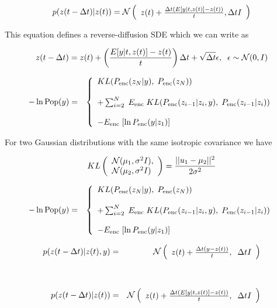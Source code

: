 {

$$p(z(t - \Delta t)|z(t)) = {\cal N}\left(\begin{array}{l} z(t) + \frac{\Delta t(E[y|t,z(t)] - z(t))}{t}, \Delta t I\end{array}\right)$$

\vfill
This equation defines a reverse-diffusion SDE which we can write as

{\huge
$$z(t - \Delta t) = z(t) + \left(\frac{E[y|t,z(t)] - z(t)}{t}\right)\Delta t + \sqrt{\Delta t} \epsilon,\;\;\epsilon \sim {\cal N}(0,I)$$
}

{\huge
\begin{eqnarray*}
  - \ln \mathrm{Pop}(y) & = & \left\{\begin{array}{l} KL(P_{\mathrm{enc}}(z_N|y),\;P_{\mathrm{enc}}(z_N)) \\ \\ + \sum_{i=2}^N  \; E_{\mathrm{enc}}\; KL(P_{\mathrm{enc}}(z_{i-1}|z_i,y),\;P_{\mathrm{enc}}(z_{i-1}|z_i)) \\ \\ - E_{\mathrm{enc}}\;[\ln P_{\mathrm{enc}}(y|z_1)] \end{array}\right.
  \end{eqnarray*}

\vfill
For two Gaussian distributions with the same isotropic covariance we have

\vfill
$$KL\left(\begin{array}{l}{\cal N}(\mu_1,\sigma^2 I), \\ {\cal N}(\mu_2,\sigma^2 I) \end{array}\right) = \frac{||u_1 -\mu_2||^2}{2\sigma^2}$$
}

\begin{eqnarray*}
  - \ln \mathrm{Pop}(y) & = & \left\{\begin{array}{l} KL(P_{\mathrm{enc}}(z_N|y),\;P_{\mathrm{enc}}(z_N)) \\ \\ + \sum_{i=2}^N  \; E_{\mathrm{enc}}\; KL(P_{\mathrm{enc}}(z_{i-1}|z_i,y),\;P_{\mathrm{enc}}(z_{i-1}|z_i)) \\ \\ - E_{\mathrm{enc}}\;[\ln P_{\mathrm{enc}}(y|z_1)] \end{array}\right.
\end{eqnarray*}

\vfill
\begin{eqnarray*}
  p(z(t - \Delta t)|z(t),y) & = & {\cal N}\left(\begin{array}{l}z(t) + \frac{\Delta t(y - z(t))}{t},\;\; \Delta t I\end{array}\right) \\
  \\
  \\
  p(z(t - \Delta t)|z(t)) & = & {\cal N}\left(\begin{array}{l} z(t) + \frac{\Delta t(E[y|t,z(t)] - z(t))}{t}, \;\; \Delta t I\end{array}\right)
\end{eqnarray*}

}
